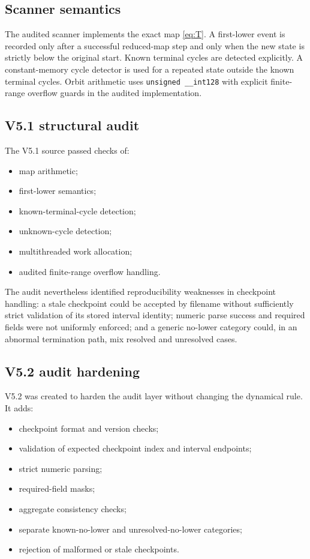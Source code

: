 \documentclass[11pt]{article}
\theoremstyle{definition}
\theoremstyle{remark}
\begin{document}
\subsection{Scanner semantics}

The audited scanner implements the exact map \eqref{eq:T}.  A first-lower event is recorded only after a successful reduced-map step and only when the new state is strictly below the original start.  Known terminal cycles are detected explicitly.  A constant-memory cycle detector is used for a repeated state outside the known terminal cycles.  Orbit arithmetic uses \texttt{unsigned \_\_int128} with explicit finite-range overflow guards in the audited implementation.

\subsection{V5.1 structural audit}

The V5.1 source passed checks of:
\begin{itemize}[leftmargin=2em]
\item map arithmetic;
\item first-lower semantics;
\item known-terminal-cycle detection;
\item unknown-cycle detection;
\item multithreaded work allocation;
\item audited finite-range overflow handling.
\end{itemize}

The audit nevertheless identified reproducibility weaknesses in checkpoint handling: a stale checkpoint could be accepted by filename without sufficiently strict validation of its stored interval identity; numeric parse success and required fields were not uniformly enforced; and a generic no-lower category could, in an abnormal termination path, mix resolved and unresolved cases.

\subsection{V5.2 audit hardening}

V5.2 was created to harden the audit layer without changing the dynamical rule.  It adds:
\begin{itemize}[leftmargin=2em]
\item checkpoint format and version checks;
\item validation of expected checkpoint index and interval endpoints;
\item strict numeric parsing;
\item required-field masks;
\item aggregate consistency checks;
\item separate known-no-lower and unresolved-no-lower categories;
\item rejection of malformed or stale checkpoints.
\end{itemize}
\end{document}
